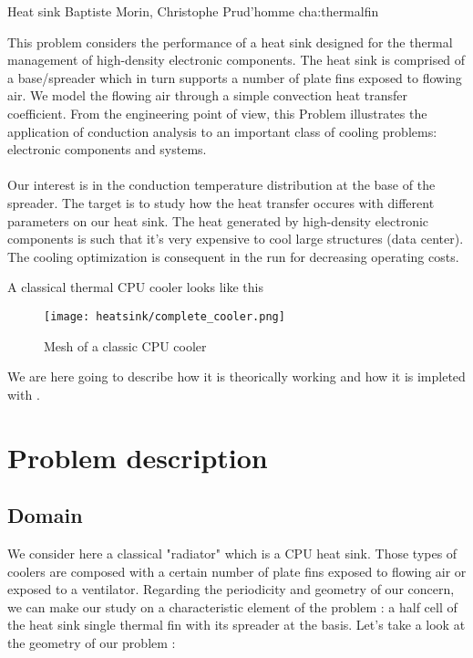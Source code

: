             {Heat sink}
            {Baptiste Morin, Christophe Prud'homme}
            {cha:thermalfin}

This problem considers the performance of a heat sink designed for the thermal management of high-density electronic components. The heat sink is comprised of a base/spreader which in turn supports a number of plate fins exposed to flowing air. We model the flowing air through a simple convection heat transfer coefficient. From the engineering point of view, this Problem illustrates the application of conduction analysis to an important class of cooling problems: electronic components and systems. \\ \\
Our interest is in the conduction temperature distribution at the base of the spreader. The target is to study how the heat transfer occures with different parameters on our heat sink. The heat generated by high-density electronic components is such that it's very expensive to cool large structures (data center). The cooling optimization is consequent in the run for decreasing operating costs.

\noindent A classical thermal CPU cooler looks like this 

\begin{figure}[!h]
\centering
\texttt{[image: heatsink/complete\_cooler.png]}
\caption{Mesh of a classic CPU cooler}
\end{figure}

\noindent We are here going to describe how it is theorically working and how it is impleted with \feel. 

\section{Problem description}
\subsection{Domain}

We consider here a classical "radiator" which is a CPU heat sink. Those types of coolers are composed with a certain number of plate fins exposed to flowing air or exposed to a ventilator. Regarding the periodicity and geometry of our concern, we can make our study on a characteristic element of the problem : a half cell of the heat sink single thermal fin with its spreader at the basis. Let's take a look at the geometry of our problem :

